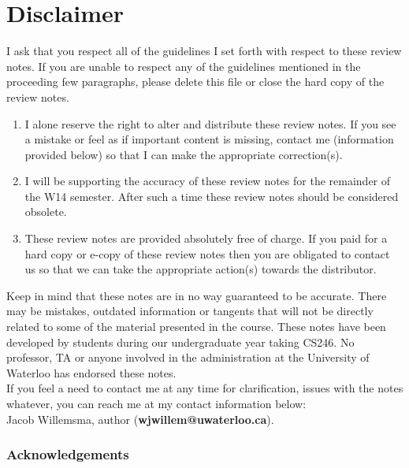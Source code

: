 \section*{Disclaimer}

I ask that you respect all of the guidelines I set forth with respect to these review notes. If you are unable to respect any of the guidelines mentioned in the proceeding few paragraphs, please delete this file or close the hard copy of the review notes.\\

\begin{enumerate}

\item I alone reserve the right to alter and distribute these review notes. If you see a mistake or feel as if important content is missing, contact me (information provided below) so that I can make the appropriate correction(s).

\item I will be supporting the accuracy of these review notes for the remainder of the W14 semester. After such a time these review notes should be considered obsolete.

\item These review notes are provided absolutely free of charge. If you paid for a hard copy or e-copy of these review notes then you are obligated to contact us so that we can take the appropriate action(s) towards the distributor.

\end{enumerate}

Keep in mind that these notes are in no way guaranteed to be accurate. There may be mistakes, outdated information or tangents that will not be directly related to some of the material presented in the course. These notes have been developed by students during our undergraduate year taking CS246. No professor, TA or anyone involved in the administration at the University of Waterloo has endorsed these notes.\\

If you feel a need to contact me at any time for clarification, issues with the notes whatever, you can reach me at my contact information below:\\
Jacob Willemsma, author (\textbf{wjwillem@uwaterloo.ca}).\\

\subsubsection*{Acknowledgements}

